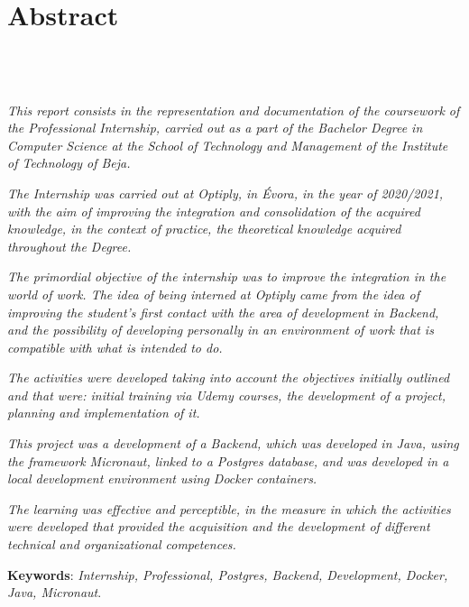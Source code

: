 \chapter{Abstract}
\section*{\textit{\TITULO}\\  {\small{\textit{\SUBTITULO}}}}

\textit{This report consists in the representation and documentation of the coursework of the Professional Internship, carried out as a part of the Bachelor Degree in Computer Science at the School of Technology and Management of the Institute of Technology of Beja.}

\textit{The Internship was carried out at Optiply, in Évora, in the year of 2020/2021, with the aim of improving the integration and consolidation of the acquired knowledge, in the context of practice, the theoretical knowledge acquired throughout the Degree.}

\textit{The primordial objective of the internship was to improve the integration in the world of work. The idea of being interned at Optiply came from the idea of improving the student's first contact with the area of development in Backend, and the possibility of developing personally in an environment of work that is compatible with what is intended to do.}

\textit{The activities were developed taking into account the objectives initially outlined and that were: initial training via Udemy courses, the development of a project, planning and implementation of it.}

\textit{This project was a development of a Backend, which was developed in Java, using the framework Micronaut, linked to a Postgres database, and was developed in a local development environment using Docker containers.}

\textit{The learning was effective and perceptible, in the measure in which the activities were developed that provided the acquisition and the development of different technical and organizational competences.}

\textbf{Keywords}: \textit{Internship, Professional, Postgres, Backend, Development, Docker, Java, Micronaut}.
